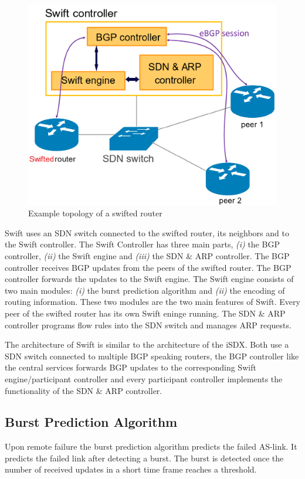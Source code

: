 \begin{figure}[h]
\center
\includegraphics[scale = 0.3]{Figures/swift_topo_cropped.pdf}
\caption{Example topology of a swifted router \cite{swift}}
\end{figure}

Swift uses an SDN switch connected to the swifted router, its neighbors and to the Swift controller. The Swift Controller has three main parts, \emph{(i)} the BGP controller, \emph{(ii)} the Swift engine and \emph{(iii)} the SDN \& ARP controller. The BGP controller receives BGP updates from the peers of the swifted router. The BGP controller forwards the updates to the Swift engine. The Swift engine consists of two main modules: \emph{(i)} the burst prediction algorithm and \emph{(ii)} the encoding of routing information. These two modules are the two main features of Swift. Every peer of the swifted router has its own Swift eninge running. The SDN \& ARP controller programs flow rules into the SDN switch and manages ARP requests. 

The architecture of Swift is similar to the architecture of the iSDX. Both use a SDN switch connected to multiple BGP speaking routers, the BGP controller like the central services forwards BGP updates to the corresponding Swift engine/participant controller and every participant controller implements the functionality of the SDN \& ARP controller. 

\subsection{\label{chapter2:Swift:BPA}Burst Prediction Algorithm}
Upon remote failure the burst prediction algorithm predicts the failed AS-link. It predicts the failed link after detecting a burst. The burst is detected once the number of received updates in a short time frame reaches a threshold.

